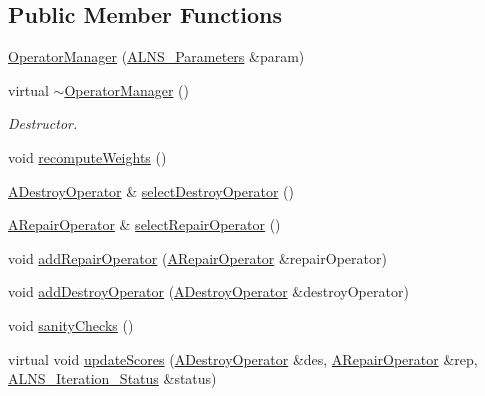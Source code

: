 \subsection*{\-Public \-Member \-Functions}
\begin{DoxyCompactItemize}
\item 
\hyperlink{classOperatorManager_ae4f84de6b7812b951ee202e8c2afe478}{\-Operator\-Manager} (\hyperlink{classALNS__Parameters}{\-A\-L\-N\-S\-\_\-\-Parameters} \&param)
\item 
\hypertarget{classOperatorManager_ad0b56a48c3e5ccb422f8944bcd3dce6d}{virtual \hyperlink{classOperatorManager_ad0b56a48c3e5ccb422f8944bcd3dce6d}{$\sim$\-Operator\-Manager} ()}\label{classOperatorManager_ad0b56a48c3e5ccb422f8944bcd3dce6d}

\begin{DoxyCompactList}\small\item\em \-Destructor. \end{DoxyCompactList}\item 
void \hyperlink{classOperatorManager_afcd6148f23aa4faae18bc5b8a08cbd20}{recompute\-Weights} ()
\item 
\hyperlink{classADestroyOperator}{\-A\-Destroy\-Operator} \& \hyperlink{classOperatorManager_ae2b34fa76d49119d61836db181890085}{select\-Destroy\-Operator} ()
\item 
\hyperlink{classARepairOperator}{\-A\-Repair\-Operator} \& \hyperlink{classOperatorManager_a620514b4b09095e5533e2fe3a44df529}{select\-Repair\-Operator} ()
\item 
void \hyperlink{classOperatorManager_a4bbeee23953420b0be2d6a72388e75e9}{add\-Repair\-Operator} (\hyperlink{classARepairOperator}{\-A\-Repair\-Operator} \&repair\-Operator)
\item 
void \hyperlink{classOperatorManager_a5760dee74c37a6d5e3fea78250afbd69}{add\-Destroy\-Operator} (\hyperlink{classADestroyOperator}{\-A\-Destroy\-Operator} \&destroy\-Operator)
\item 
void \hyperlink{classOperatorManager_a7313370bb35e71f7a70e770c4f1f8c14}{sanity\-Checks} ()
\item 
\hypertarget{classOperatorManager_a06445bfd3151e3dfa51b06ab1664a7c7}{virtual void \hyperlink{classOperatorManager_a06445bfd3151e3dfa51b06ab1664a7c7}{update\-Scores} (\hyperlink{classADestroyOperator}{\-A\-Destroy\-Operator} \&des, \hyperlink{classARepairOperator}{\-A\-Repair\-Operator} \&rep, \hyperlink{classALNS__Iteration__Status}{\-A\-L\-N\-S\-\_\-\-Iteration\-\_\-\-Status} \&status)}\label{classOperatorManager_a06445bfd3151e3dfa51b06ab1664a7c7}


\end{DoxyCompactItemize}
